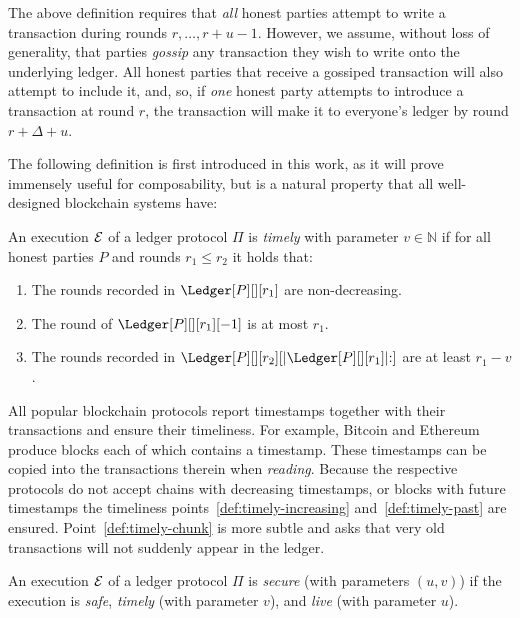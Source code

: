 The above definition requires that \emph{all} honest parties attempt to
write a transaction during rounds $r, \ldots, r + u - 1$. However, we
assume, without loss of generality,
that parties \emph{gossip} any transaction they wish to write onto
the underlying ledger. All honest parties that receive a gossiped transaction
will also attempt to include it, and, so, if \emph{one} honest party
attempts to introduce a transaction at round $r$, the transaction will
make it to everyone's ledger by round $r + \Delta + u$.

The following definition is first introduced in this work, as it will prove
immensely useful for composability, but is a natural property that all well-designed
blockchain systems have:

\begin{definition}[Timely]\label{def:timely}
  An execution $\mathcal{E}$ of a ledger protocol $\Pi$ is \emph{timely} with parameter $v \in \mathbb{N}$
  if for all honest parties $P$ and rounds $r_1 \leq r_2$ it holds that:

  \begin{enumerate}
    \item The rounds recorded in $\Ledger[P][][r_1]$ are non-decreasing.\label{def:timely-increasing}
    \item The round of $\Ledger[P][][r_1][-1]$ is at most $r_1$.\label{def:timely-past}
    \item The rounds recorded in $\Ledger[P][][r_2][|\Ledger[P][][r_1]|{:}]$ are at least $r_1 - v$.\label{def:timely-chunk}
  \end{enumerate}
\end{definition}

All popular blockchain protocols report timestamps together with their
transactions and ensure their timeliness. For example, Bitcoin and Ethereum
produce blocks each of which contains a timestamp. These timestamps can be copied
into the transactions therein when \emph{reading}. Because the respective protocols do not accept
chains with decreasing timestamps, or blocks with future timestamps the timeliness
points~\ref{def:timely-increasing} and~\ref{def:timely-past} are ensured.
Point~\ref{def:timely-chunk} is more subtle and asks that very old transactions will
not suddenly appear in the ledger.

\begin{definition}[Secure]
  An execution $\mathcal{E}$ of a ledger protocol $\Pi$ is \emph{secure} (with parameters $(u, v)$) if the execution
  is \emph{safe}, \emph{timely} (with parameter $v$), and \emph{live} (with parameter $u$).
\end{definition}
